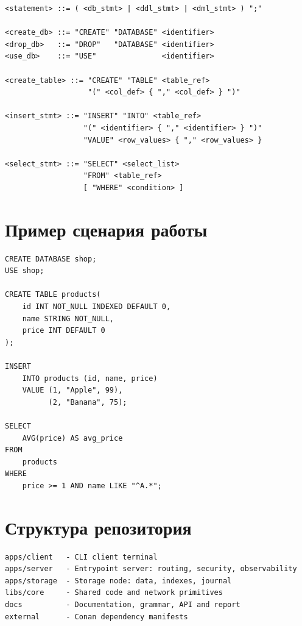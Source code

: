 \documentclass[a4paper,14pt]{extarticle}
\begin{document}
\begin{lstlisting}[style=qdbcpp,caption={Фрагмент EBNF-грамматики языка QuasarDB}]
<statement> ::= ( <db_stmt> | <ddl_stmt> | <dml_stmt> ) ";"

<create_db> ::= "CREATE" "DATABASE" <identifier>
<drop_db>   ::= "DROP"   "DATABASE" <identifier>
<use_db>    ::= "USE"               <identifier>

<create_table> ::= "CREATE" "TABLE" <table_ref>
                   "(" <col_def> { "," <col_def> } ")"

<insert_stmt> ::= "INSERT" "INTO" <table_ref>
                  "(" <identifier> { "," <identifier> } ")"
                  "VALUE" <row_values> { "," <row_values> }

<select_stmt> ::= "SELECT" <select_list>
                  "FROM" <table_ref>
                  [ "WHERE" <condition> ]
\end{lstlisting}

\section{Пример сценария работы}

\begin{lstlisting}[style=qdbcpp,caption={Пример SQL-сценария для QuasarDB}]
CREATE DATABASE shop;
USE shop;

CREATE TABLE products(
    id INT NOT_NULL INDEXED DEFAULT 0,
    name STRING NOT_NULL,
    price INT DEFAULT 0
);

INSERT
    INTO products (id, name, price)
    VALUE (1, "Apple", 99),
          (2, "Banana", 75);

SELECT
    AVG(price) AS avg_price
FROM
    products
WHERE
    price >= 1 AND name LIKE "^A.*";
\end{lstlisting}

\section{Структура репозитория}

\begin{lstlisting}[style=qdbcpp,caption={Основные каталоги проекта}]
apps/client   - CLI client terminal
apps/server   - Entrypoint server: routing, security, observability
apps/storage  - Storage node: data, indexes, journal
libs/core     - Shared code and network primitives
docs          - Documentation, grammar, API and report
external      - Conan dependency manifests
\end{lstlisting}
\end{document}
